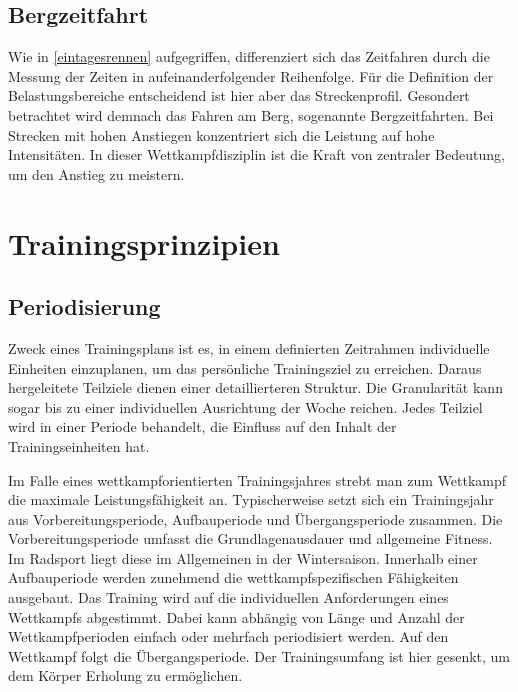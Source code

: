 \subsection{Bergzeitfahrt}
Wie in \ref{eintagesrennen} aufgegriffen, differenziert sich das Zeitfahren durch die Messung der Zeiten in aufeinanderfolgender Reihenfolge. Für die Definition der Belastungsbereiche entscheidend ist hier aber das Streckenprofil. Gesondert betrachtet wird demnach das Fahren am Berg, sogenannte Bergzeitfahrten. Bei Strecken mit hohen Anstiegen konzentriert sich die Leistung auf hohe Intensitäten. In dieser Wettkampfdisziplin ist die Kraft von zentraler Bedeutung, um den Anstieg zu meistern.

\section{Trainingsprinzipien}
\subsection{Periodisierung}
Zweck eines Trainingsplans ist es, in einem definierten Zeitrahmen individuelle Einheiten einzuplanen, um das persönliche Trainingsziel zu erreichen. Daraus hergeleitete Teilziele dienen einer detaillierteren Struktur. Die Granularität kann sogar bis zu einer individuellen Ausrichtung der Woche reichen. Jedes Teilziel wird in einer Periode behandelt, die Einfluss auf den Inhalt der Trainingseinheiten hat. \cite{periodization} \par
Im Falle eines wettkampforientierten Trainingsjahres strebt man zum Wettkampf die maximale Leistungsfähigkeit an. Typischerweise setzt sich ein Trainingsjahr aus Vorbereitungsperiode, Aufbauperiode und Übergangsperiode zusammen. \cite[279]{Trainingswissenschaft}  \newline
Die Vorbereitungsperiode umfasst die Grundlagenausdauer und allgemeine Fitness. Im Radsport liegt diese im Allgemeinen in der Wintersaison. \newline
Innerhalb einer Aufbauperiode werden zunehmend die wettkampfspezifischen Fähigkeiten ausgebaut. Das Training wird auf die individuellen Anforderungen eines Wettkampfs abgestimmt. Dabei kann abhängig von Länge und Anzahl der Wettkampfperioden einfach oder mehrfach periodisiert werden. \newline
Auf den Wettkampf folgt die Übergangsperiode. Der Trainingsumfang ist hier gesenkt, um dem Körper Erholung zu ermöglichen.

